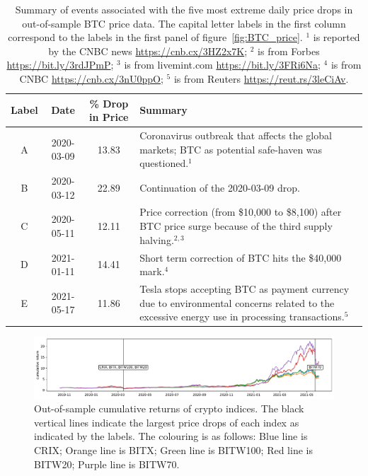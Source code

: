 \begin{table}[!h]
    \centering
      \begin{tabularx}{.8\textwidth}{cccX}
        \toprule
        Label &   Date & \% Drop in Price &  Summary\\
        \midrule
        A &  2020-03-09 & 13.83 &  Coronavirus outbreak that affects
        the global markets; BTC as potential safe-haven was
        questioned.$^1$\\ 
        B &  2020-03-12 & 22.89 &  Continuation of the 2020-03-09
        drop.  \\ 
        C &  2020-05-11 & 12.11 &  Price correction (from \$10,000 to
        \$8,100) after BTC price surge because of the third supply
        halving.$^{2,3}$ \\ 
        D &  2021-01-11 & 14.41 &  Short term correction of BTC hits
        the \$40,000 mark.$^4$\\ 
        E &  2021-05-17 & 11.86 &  Tesla stops accepting BTC as
        payment currency due to environmental concerns related to the
        excessive energy use in processing transactions.$^5$\\ 
        \bottomrule
      \end{tabularx}
        \caption{Summary of events associated with the five most
          extreme daily price drops in out-of-sample BTC price data. 
        The capital letter labels in the first column correspond to
        the labels in the first panel of figure~\ref{fig:BTC_price}. 
        $^1$ is reported by the CNBC news \url{https://cnb.cx/3HZ2x7K}; $^2$ is from Forbes \url{https://bit.ly/3rdJPmP};
        $^3$ is from livemint.com \url{https://bit.ly/3FRi6Na};
        $^4$ is from CNBC \url{https://cnb.cx/3nU0ppO};
        $^5$ is from Reuters \url{https://reut.rs/3leCiAv}.
        }
        \label{tab:BTC_5min}
  \end{table}
\clearpage
\newpage

\begin{figure}[t]
\includegraphics[width=\textwidth]{_pics/index_price.pdf}
  \caption{Out-of-sample cumulative returns of crypto indices. 
  The black vertical lines indicate the largest price drops of each
  index as indicated by the labels.
  The colouring is as follows:
  \textcolor{plt1}{Blue line} is CRIX;
  \textcolor{plt2}{Orange line} is BITX;
  \textcolor{plt3}{Green line} is BITW100;
  \textcolor{plt4}{Red line} is BITW20;
  \textcolor{plt5}{Purple line} is BITW70.
  }
\label{fig:index_price}
\end{figure}

